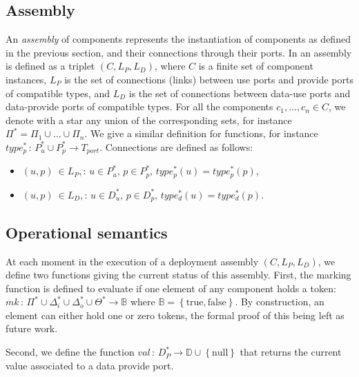 \subsection{Assembly}

An \emph{assembly} of components represents the instantiation of
components as defined in the previous section, and their connections
through their ports. In \mad an assembly is defined as a triplet
$(C, L_{P}, L_{D})$, where $C$ is a finite set of component instances,
$L_{P}$ is the set of connections (links) between use ports and
provide ports of compatible types, and $L_{D}$ is the set of
connections between data-use ports and data-provide ports of
compatible types. For all the components $c_1,\dots,c_n \in C$, we
denote with a star any union of the corresponding sets, for instance
$\Pi^* = \Pi_1 \cup \dots \cup \Pi_n$. We give a similar definition
for functions, for instance
$type_{p}^*\,:\,P_{u}^*\cup P_{p}^*\rightarrow T_{port}$. Connections
are defined as follows:

\begin{itemize}
\item $\left(u,p\right)\ \in L_{P},:\,u\in P_{u}^{*},\,p\in P_{p}^{*},\,type_{p}^{*}\left(u\right)=type_{p}^{*}\left(p\right)$,
\item $\left(u,p\right)\ \in L_{D},:\,u\in D_{u}^{*},\,p\in D_{p}^{*},\,type_{d}^{*}\left(u\right)=type_{d}^{*}\left(p\right)$.
\end{itemize}

\subsection{Operational semantics}
\label{subsec:operational_semantics}

At each moment in the execution of a \mad deployment assembly
$(C, L_{P}, L_{D})$, we define two functions giving the current
status of this assembly. First, the marking function is defined
to evaluate if one element of any component holds a token:
$mk\,:\,\Pi^{*}\cup\Delta_{i}^{*}\cup\Delta_{o}^{*}\cup\Theta^{*}\rightarrow\mathbb{B}$
where $\mathbb{B}=\left\{ \text{true},\text{false}\right\}$. By
construction, an element can either hold one or zero tokens, the
formal proof of this being left as future work.

Second, we define the function
$val\,:\,D_{P}^{*}\rightarrow \mathbb{D}\cup\left\{ \text{null}\right\}$
that returns the current value associated to a data provide port.

